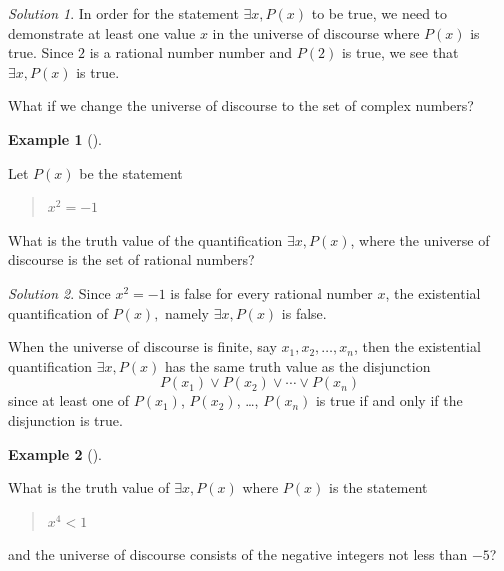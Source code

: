 \documentclass[
  letterpaper,
  10pt,
  reqno,
  twopage,
  openany]{book}
\theoremstyle{plain}
\theoremstyle{definition}
\theoremstyle{definition}
\theoremstyle{definition}
\newtheorem{example}{Example}[chapter]
\theoremstyle{plain}
\theoremstyle{plain}
\theoremstyle{remark}
\newtheorem*{solution}{Solution}
\begin{document}
\begin{solution}

In order for the statement \(\exists x, P(x)\) to be true, we need to
demonstrate at least one value \(x\) in the universe of discourse where
\(P(x)\) is true. Since \(2\) is a rational number number and \(P(2)\)
is true, we see that \(\exists x, P(x)\) is true.

\end{solution}

What if we change the universe of discourse to the set of complex
numbers?

\leavevmode{}%
\begin{example}[]\label{exm-eq-2}

Let \(P(x)\) be the statement

\begin{quote}
\(x^2=-1\)
\end{quote}

What is the truth value of the quantification \(\exists x, P(x)\), where
the universe of discourse is the set of rational numbers?

\end{example}

\begin{solution}

Since \(x^2=-1\) is false for every rational number \(x\), the
existential quantification of \(P(x),\) namely \(\exists x, P(x)\) is
false.

\end{solution}

When the universe of discourse is finite, say \(x_1, x_2, \ldots, x_n\),
then the existential quantification \(\exists x, P(x)\) has the same
truth value as the disjunction \begin{equation}
P(x_1)\lor P(x_2) \lor \cdots \lor P(x_n)
\end{equation} since at least one of \(P(x_1)\), \(P(x_2)\), \ldots,
\(P(x_n)\) is true if and only if the disjunction is true.

\leavevmode{}%
\begin{example}[]\label{exm-existex}

What is the truth value of \(\exists x, P(x)\) where \(P(x)\) is the
statement

\begin{quote}
\(x^4<1\)
\end{quote}

and the universe of discourse consists of the negative integers not less
than \(-5\)?

\end{example}
\end{document}

